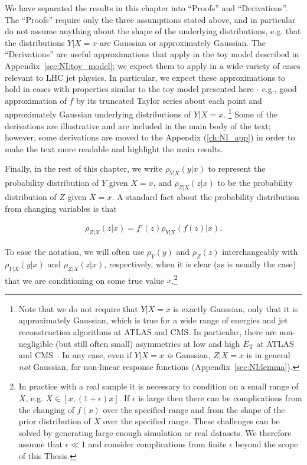 We have separated the results in this chapter into ``Proofs'' and ``Derivations''.
The ``Proofs'' require only the three assumptions stated above, and in particular do not assume anything about the shape of the underlying distributions, e.g. that the distributions $Y|X=x$ are Gaussian or approximately Gaussian.
The ``Derivations'' are useful approximations that apply in the toy model described in Appendix~\ref{sec:NI:toy_model}; we expect them to apply in a wide variety of cases relevant to LHC jet physics.
In particular, we expect these approximations to hold in cases with properties similar to the toy model presented here - e.g., good approximation of $f$ by its truncated Taylor series about each point and approximately Gaussian underlying distributions of $Y|X=x$.
\footnote{Note that we do not require that $Y|X=x$ is exactly Gaussian, only that it is approximately Gaussian, which is true for a wide range of energies and jet reconstruction algorithms at ATLAS and CMS. In particular, there are non-negligible (but still often small) asymmetries at low and high $E_\text{T}$ at ATLAS and CMS~\cite{Aad:2011he,Chatrchyan:2011ds,Khachatryan:2016kdb}. In any case, even if $Y|X=x$ {\it is} Gaussian, $Z|X=x$ is in general {\it not} Gaussian, for non-linear response functions (Appendix~\ref{sec:NI:lemma}).}
Some of the derivations are illustrative and are included in the main body of the text; however, some derivations are moved to the Appendix (\ref{ch:NI_app}) in order to make the text more readable and highlight the main results.

Finally, in the rest of this chapter, we write $\rho_{Y|X}(y|x)$ to represent the probability distribution of $Y$ given $X=x$, and $\rho_{Z|X}(z|x)$ to be the probability distribution of $Z$ given $X=x$. A standard fact about the probability distribution from changing variables is that

\begin{align}
\rho_{Z|X}(z|x) = f'(z)\rho_{Y|X}(f(z)|x).
\label{eqn:NI:newdist}
\end{align}

To ease the notation, we will often use $\rho_Y(y)$ and $\rho_Z(z)$ interchangeably with $\rho_{Y|X}(y|x)$ and $\rho_{Z|X}(z|x)$, respectively, when it is clear (as is usually the case) that we are conditioning on some true value $x$.\footnote{In practice with a real sample it is necessary to condition on a small range of $X$, e.g. $X\in[x,(1+\epsilon)x]$. If $\epsilon$ is large then there can be complications from the changing of $f(x)$ over the specified range and from the shape of the prior distribution of $X$ over the specified range.  These challenges can be solved by generating large enough simulation or real datasets.  We therefore assume that $\epsilon \ll 1$ and consider complications from finite $\epsilon$ beyond the scope of this Thesis.}


